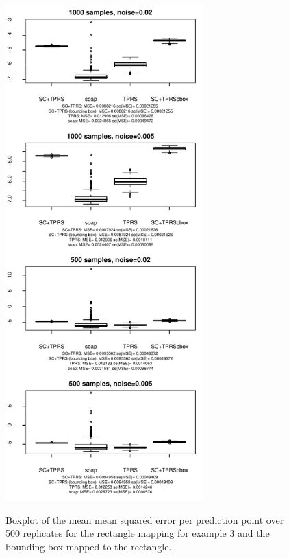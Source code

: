 \documentclass[a4paper,10pt]{amsart}
\begin{document}
\begin{figure}[p]
\centering
\includegraphics[width=3in]{figs-otherdomains/wigglytop2-boxplot.pdf} \\
\caption{Boxplot of the mean mean squared error per prediction point over 500 replicates for the rectangle mapping for example 3 and the bounding box mapped to the rectangle.}
\label{wigglytop2-boxplots}
\end{figure}
\end{document}
